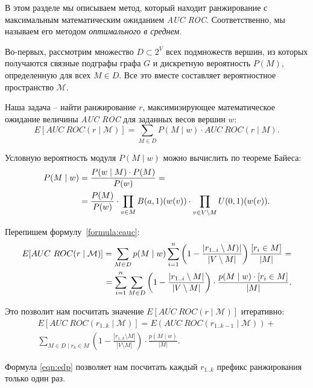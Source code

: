 В этом разделе мы описываем метод, который находит ранжирование с максимальным
математическим ожиданием \emph{AUC ROC}. Соответственно, мы называем его
методом \emph{оптимального в среднем}.

Во-первых, рассмотрим множество $D \subset 2^V$ всех подмножеств вершин, из
которых получаются связные подграфы графа $G$ и дискретную вероятность $P(M)$,
определенную для всех $M \in D$. Все это вместе составляет вероятностное
пространство $\mathcal{M}$.

Наша задача -- найти ранжирование $r$, максимизирующее математическое ожидание
величины \emph{AUC ROC} для заданных весов вершин $w$:
\begin{equation} \label{formula:eauc} 
    E[AUC~ROC(r \mid \mathcal{M})] = \sum_{M \in D} P(M \mid w) \cdot AUC~ROC(r
    \mid M).
\end{equation}

Условную вероятность модуля $P(M \mid w)$ можно вычислить по теореме Байеса:
\begin{align}
    P(M \mid w) &= \frac{P(w \mid M) \cdot P(M)}{P(w)} = \notag \\
    &= \frac{P(M)}{P(w)} \cdot \prod_{v \in M} B(a,1)(w(v)) \cdot \prod_{v
    \in {V \setminus M}} U(0,1)(w(v)).
\end{align}

Перепишем формулу~\ref{formula:eauc}:
\begin{align}
    E[AUC~ROC(r \mid \mathcal{M})] = \sum_{M \in D} p(M \mid w) \sum_{i=1}^n \left(
    1 - \frac{|r_{1..i} \setminus M)|}{|V \setminus M|}\right) \frac{[r_i \in
      M]}{|M|} = \notag\\
    =  \sum_{i=1}^n \sum_{M \in D}  \left(
    1 - \frac{|r_{1..i}\setminus M|}{|V \setminus M|}\right) \cdot \frac{p(M \mid w)
      \cdot [r_i \in M]}{|M|}.
\end{align}

Это позволит нам посчитать значение $E[AUC~ROC(r \mid \mathcal{M})]$ итеративно:
\begin{multline} \label{eqn:edp}
    E[AUC~ROC(r_{1..k} \mid \mathcal{M})] = E(AUC~ROC(r_{1..k-1} \mid
    \mathcal{M})) + \\ \sum_{M \in D \mid r_k \in M} \left( 1 - \frac{|r_{1..k}
    \setminus M|}{|V \setminus M|}\right) \cdot \frac{p(M \mid w)}{|M|}. 
\end{multline}

Формула \eqref{eqn:edp} позволяет нам посчитать каждый $r_{1..k}$ префикс
ранжирования только один раз.


